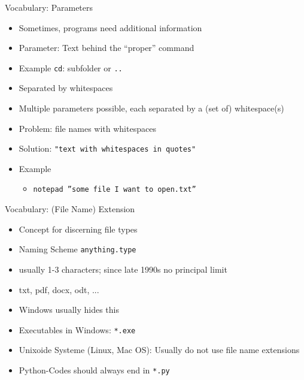 
\begin{frame}{Vocabulary: Parameters}
%
\begin{itemize}
\item Sometimes, programs need additional information
\item Parameter: Text behind the \enquote{proper} command
\item Example \texttt{cd}: subfolder or \texttt{..}
\item Separated by whitespaces
\item Multiple parameters possible, each separated by a (set of) whitespace(s)
\item Problem: file names with whitespaces
\item Solution: \texttt{"text with whitespaces in quotes"}
\item Example
	\begin{itemize}
	\item \texttt{notepad ''some file I want to open.txt''}
	\end{itemize}
\end{itemize}
%
\end{frame}


\begin{frame}{Vocabulary: (File Name) Extension}
%
\begin{itemize}
\item Concept for discerning file types
\item Naming Scheme \texttt{anything.type}
\item usually 1-3 characters; since late 1990s no principal limit
\item txt, pdf, docx, odt, ...
\item Windows usually hides this
\item Executables in Windows: \texttt{*.exe}
\item Unixoide Systeme (Linux, Mac OS): Usually do not use file name extensions
\item Python-Codes should always end in \texttt{*.py}
\end{itemize}
%
\end{frame}


